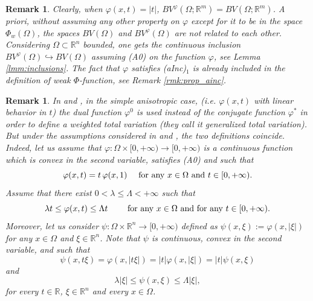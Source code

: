 \documentclass[a4paper,11pt,oneside,notitlepage]{article}
\newtheorem{remark}[theorem]{Remark}
\numberwithin{equation}{section}
\def\R{\mathbb{R}}
\newcommand{\vphi}{\varphi}
\begin{document}
\begin{remark}
\label{rmk:A0_si_no}
    Clearly, when $\vphi(x,t) = |t|$, $BV^\varphi(\Omega;\R^m)= BV(\Omega;\R^m)$. A priori, without assuming any other property on $\vphi$ except for it to be in the space $\Phi_w(\Omega)$, the spaces $BV(\Omega)$ and $BV^\vphi(\Omega)$ are not related to each other. Considering $\Omega \subset \R^n$ bounded, one gets the continuous inclusion $BV^\vphi(\Omega) \hookrightarrow BV(\Omega)$ assuming (A0) on the function $\vphi$, see Lemma \ref{lmm:inclusions}. The fact that $\vphi$ satisfies (aInc)$_1$ is already included in the definition of weak $\Phi$-function, see Remark \ref{rmk:prop_ainc}.
\end{remark}

\begin{remark}
    In \cite{AB} and \cite{M05}, in the simple anisotropic case, (i.e. $\varphi(x,t)$ with linear behavior in $t$) the dual function $\vphi^0$ is used instead of the conjugate function $\vphi^*$ in order to define a weighted total variation (they call it {\it generalized total variation}). But under the assumptions considered in \cite{AB} and \cite{M05}, the two definitions coincide. Indeed, let us assume that $\vphi: \Omega \times [0, +\infty) \to [0,+\infty)$ is a continuous function which is convex in the second variable, satisfies (A0) and such that
    \begin{equation*}
        \vphi(x,t) = t \, \vphi(x,1) \quad \textnormal{ for any } x \in \Omega \textnormal{ and } t \in [0, +\infty).
    \end{equation*}
    Assume that there exist $0 < \lambda \le \Lambda < +\infty$ such that 
    \begin{equation*}
        \lambda t \le \vphi(x,t) \le \Lambda t \qquad \textnormal{ for any } x \in \Omega \textnormal{ and for any } t \in [0, +\infty).
    \end{equation*}
    Moreover, let us consider $\psi : \Omega \times \R^n \to [0, +\infty)$ defined as $\psi(x,\xi) := \vphi(x, |\xi|)$ for any $x \in \Omega$ and $\xi \in \R^n$. Note that $\psi$ is continuous, convex in the second variable, and such that
    \begin{equation*}
        \psi(x, t \xi) = \vphi(x, |t \xi|) = |t|\vphi (x, |\xi|) = |t| \psi(x,\xi)
    \end{equation*}
    and
    \begin{equation*}
        \lambda |\xi|  \le \psi(x, \xi) \le \Lambda |\xi|,
    \end{equation*}
    for every $t \in \R$, $\xi \in \R^n$ and every $x \in \Omega$.

\end{remark}
\end{document}
